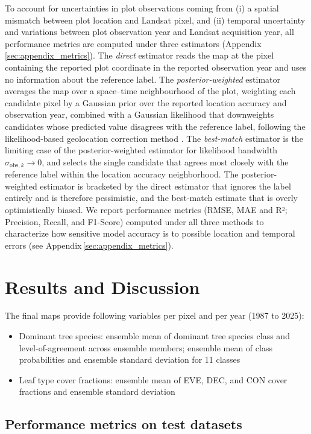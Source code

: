 \documentclass[essd, manuscript]{copernicus}
\begin{document}
To account for uncertainties in plot observations coming from (i) a spatial mismatch between plot location and Landsat pixel, and (ii) temporal uncertainty and variations between plot observation year and Landsat acquisition year, all performance metrics are computed under three estimators (Appendix\,\ref{sec:appendix_metrics}). The \emph{direct} estimator reads the map at the pixel containing the reported plot coordinate in the reported observation year and uses no information about the reference label. The \emph{posterior-weighted} estimator averages the map over a space--time neighbourhood of the plot, weighting each candidate pixel by a Gaussian prior over the reported location accuracy and observation year, combined with a Gaussian likelihood that downweights candidates whose predicted value disagrees with the reference label, following the likelihood-based geolocation correction method \citep{lobo_bayesian_2020,shannon_quantifying_2024}. The \emph{best-match} estimator is the limiting case of the posterior-weighted estimator for likelihood bandwidth $\sigma_{\mathrm{obs},k}\!\to\!0$, and selects the single candidate that agrees most closely with the reference label within the location accuracy neighborhood. The posterior-weighted estimator is bracketed by the direct estimator that ignores the label entirely and is therefore pessimistic, and the best-match estimate that is overly optimistically biased. We report performance metrics (RMSE, MAE and R²; Precision, Recall, and F1-Score) computed under all three methods to characterize how sensitive model accuracy is to possible location and temporal errors (see Appendix\,\ref{sec:appendix_metrics}). 

\section{Results and Discussion}

The final maps provide following variables per pixel and per year (1987 to 2025):
\begin{itemize}
\item{Dominant tree species: ensemble mean of dominant tree species class and level-of-agreement across ensemble members; ensemble mean of class probabilities and ensemble standard deviation for 11 classes}
\item {Leaf type cover fractions: ensemble mean of EVE, DEC, and CON cover fractions and ensemble standard deviation} 
\end{itemize}

\subsection{Performance metrics on test datasets}
\label{sec:performance}
\end{document}
